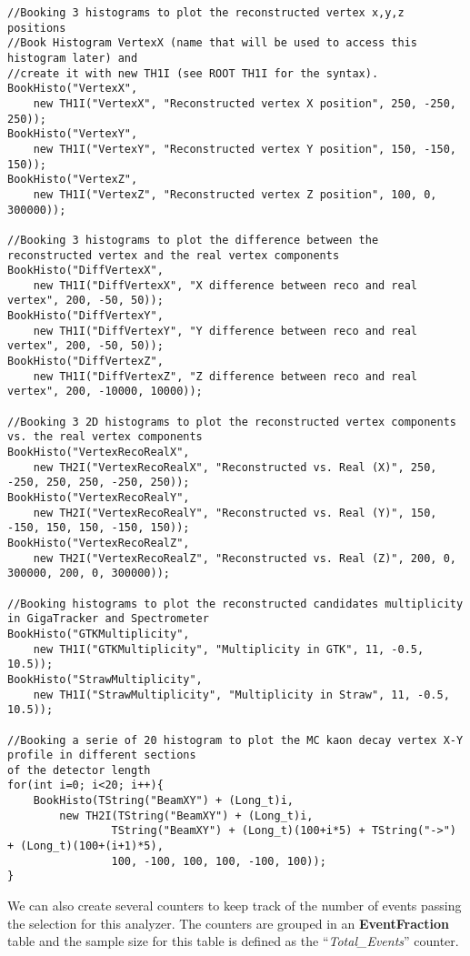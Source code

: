 \documentclass{article}
\newcommand{\class}[1]{\textbf{#1}}
\newcommand{\refcode}[1]{``\textit{#1}''}
\begin{document}
\begin{lstlisting}
//Booking 3 histograms to plot the reconstructed vertex x,y,z positions
//Book Histogram VertexX (name that will be used to access this histogram later) and 
//create it with new TH1I (see ROOT TH1I for the syntax).
BookHisto("VertexX", 
	new TH1I("VertexX", "Reconstructed vertex X position", 250, -250, 250));
BookHisto("VertexY", 
	new TH1I("VertexY", "Reconstructed vertex Y position", 150, -150, 150));
BookHisto("VertexZ", 
	new TH1I("VertexZ", "Reconstructed vertex Z position", 100, 0, 300000));

//Booking 3 histograms to plot the difference between the reconstructed vertex and the real vertex components
BookHisto("DiffVertexX", 
	new TH1I("DiffVertexX", "X difference between reco and real vertex", 200, -50, 50));
BookHisto("DiffVertexY", 
	new TH1I("DiffVertexY", "Y difference between reco and real vertex", 200, -50, 50));
BookHisto("DiffVertexZ", 
	new TH1I("DiffVertexZ", "Z difference between reco and real vertex", 200, -10000, 10000));

//Booking 3 2D histograms to plot the reconstructed vertex components vs. the real vertex components
BookHisto("VertexRecoRealX", 
	new TH2I("VertexRecoRealX", "Reconstructed vs. Real (X)", 250, -250, 250, 250, -250, 250));
BookHisto("VertexRecoRealY", 
	new TH2I("VertexRecoRealY", "Reconstructed vs. Real (Y)", 150, -150, 150, 150, -150, 150));
BookHisto("VertexRecoRealZ", 
	new TH2I("VertexRecoRealZ", "Reconstructed vs. Real (Z)", 200, 0, 300000, 200, 0, 300000));

//Booking histograms to plot the reconstructed candidates multiplicity in GigaTracker and Spectrometer
BookHisto("GTKMultiplicity", 
	new TH1I("GTKMultiplicity", "Multiplicity in GTK", 11, -0.5, 10.5));
BookHisto("StrawMultiplicity", 
	new TH1I("StrawMultiplicity", "Multiplicity in Straw", 11, -0.5, 10.5));

//Booking a serie of 20 histogram to plot the MC kaon decay vertex X-Y profile in different sections
of the detector length 
for(int i=0; i<20; i++){
	BookHisto(TString("BeamXY") + (Long_t)i, 
		new TH2I(TString("BeamXY") + (Long_t)i,
				TString("BeamXY") + (Long_t)(100+i*5) + TString("->") + (Long_t)(100+(i+1)*5),
				100, -100, 100, 100, -100, 100));
}
\end{lstlisting}

We can also create several counters to keep track of the number of events passing the selection for
this analyzer. The counters are grouped in an \class{EventFraction} table and the sample size for
this table is defined as the \refcode{Total\_Events} counter.
\end{document}
